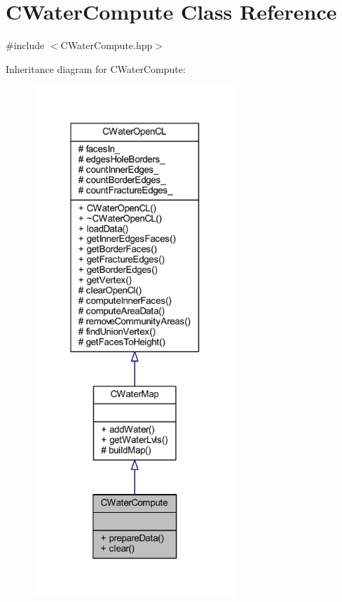 \hypertarget{class_c_water_compute}{}\section{C\+Water\+Compute Class Reference}
\label{class_c_water_compute}


{\ttfamily \#include $<$C\+Water\+Compute.\+hpp$>$}



Inheritance diagram for C\+Water\+Compute\+:
\nopagebreak
\begin{figure}[H]
\begin{center}
\leavevmode
\includegraphics[width=217pt]{class_c_water_compute__inherit__graph}
\end{center}
\end{figure}


